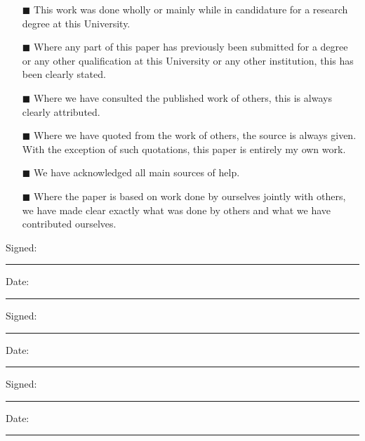 \documentclass[a4paper, 11pt, oneside]{Thesis}  %
\begin{document}
\begin{itemize} 
\item[\tiny{$\blacksquare$}] This work was done wholly or mainly while in candidature for a research degree at this University.
 
\item[\tiny{$\blacksquare$}] Where any part of this paper has previously been submitted for a degree or any other qualification at this University or any other institution, this has been clearly stated.
 
\item[\tiny{$\blacksquare$}] Where we have consulted the published work of others, this is always clearly attributed.
 
\item[\tiny{$\blacksquare$}] Where we have quoted from the work of others, the source is always given. With the exception of such quotations, this paper is entirely my own work.
 
\item[\tiny{$\blacksquare$}] We have acknowledged all main sources of help.
 
\item[\tiny{$\blacksquare$}] Where the paper is based on work done by ourselves jointly with others, we have made clear exactly what was done by others and what we have contributed ourselves.
\\
\end{itemize}
 
 
Signed:\\
\rule[1em]{25em}{0.5pt}  %
 
Date:\\
\rule[1em]{25em}{0.5pt}  %

Signed:\\
\rule[1em]{25em}{0.5pt}  %
 
Date:\\
\rule[1em]{25em}{0.5pt}  %

Signed:\\
\rule[1em]{25em}{0.5pt}  %
 
Date:\\
\rule[1em]{25em}{0.5pt}  %
\clearpage  %

%
%
%
\end{document}
